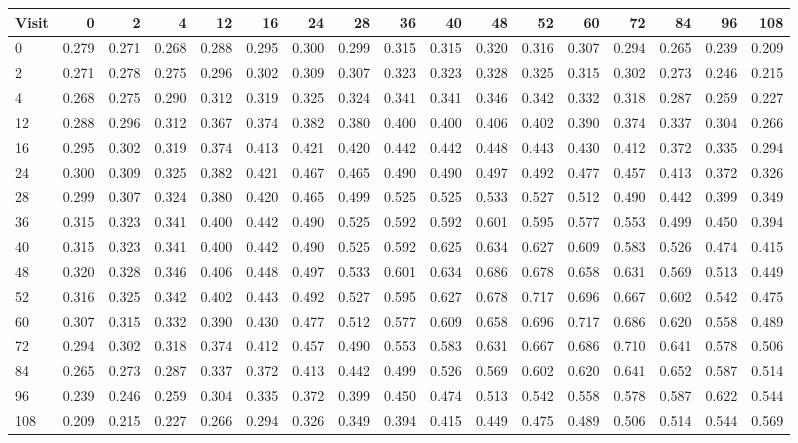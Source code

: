 \small
\begin{tabular}{lrrrrrrrrrrrrrrrr}
\hline
Visit & 0 & 2 & 4 & 12 & 16 & 24 & 28 & 36 & 40 & 48 & 52 & 60 & 72 & 84 & 96 & 108 \\
\hline
0 & 0.279 & 0.271 & 0.268 & 0.288 & 0.295 & 0.300 & 0.299 & 0.315 & 0.315 & 0.320 & 0.316 & 0.307 & 0.294 & 0.265 & 0.239 & 0.209 \\
2 & 0.271 & 0.278 & 0.275 & 0.296 & 0.302 & 0.309 & 0.307 & 0.323 & 0.323 & 0.328 & 0.325 & 0.315 & 0.302 & 0.273 & 0.246 & 0.215 \\
4 & 0.268 & 0.275 & 0.290 & 0.312 & 0.319 & 0.325 & 0.324 & 0.341 & 0.341 & 0.346 & 0.342 & 0.332 & 0.318 & 0.287 & 0.259 & 0.227 \\
12 & 0.288 & 0.296 & 0.312 & 0.367 & 0.374 & 0.382 & 0.380 & 0.400 & 0.400 & 0.406 & 0.402 & 0.390 & 0.374 & 0.337 & 0.304 & 0.266 \\
16 & 0.295 & 0.302 & 0.319 & 0.374 & 0.413 & 0.421 & 0.420 & 0.442 & 0.442 & 0.448 & 0.443 & 0.430 & 0.412 & 0.372 & 0.335 & 0.294 \\
24 & 0.300 & 0.309 & 0.325 & 0.382 & 0.421 & 0.467 & 0.465 & 0.490 & 0.490 & 0.497 & 0.492 & 0.477 & 0.457 & 0.413 & 0.372 & 0.326 \\
28 & 0.299 & 0.307 & 0.324 & 0.380 & 0.420 & 0.465 & 0.499 & 0.525 & 0.525 & 0.533 & 0.527 & 0.512 & 0.490 & 0.442 & 0.399 & 0.349 \\
36 & 0.315 & 0.323 & 0.341 & 0.400 & 0.442 & 0.490 & 0.525 & 0.592 & 0.592 & 0.601 & 0.595 & 0.577 & 0.553 & 0.499 & 0.450 & 0.394 \\
40 & 0.315 & 0.323 & 0.341 & 0.400 & 0.442 & 0.490 & 0.525 & 0.592 & 0.625 & 0.634 & 0.627 & 0.609 & 0.583 & 0.526 & 0.474 & 0.415 \\
48 & 0.320 & 0.328 & 0.346 & 0.406 & 0.448 & 0.497 & 0.533 & 0.601 & 0.634 & 0.686 & 0.678 & 0.658 & 0.631 & 0.569 & 0.513 & 0.449 \\
52 & 0.316 & 0.325 & 0.342 & 0.402 & 0.443 & 0.492 & 0.527 & 0.595 & 0.627 & 0.678 & 0.717 & 0.696 & 0.667 & 0.602 & 0.542 & 0.475 \\
60 & 0.307 & 0.315 & 0.332 & 0.390 & 0.430 & 0.477 & 0.512 & 0.577 & 0.609 & 0.658 & 0.696 & 0.717 & 0.686 & 0.620 & 0.558 & 0.489 \\
72 & 0.294 & 0.302 & 0.318 & 0.374 & 0.412 & 0.457 & 0.490 & 0.553 & 0.583 & 0.631 & 0.667 & 0.686 & 0.710 & 0.641 & 0.578 & 0.506 \\
84 & 0.265 & 0.273 & 0.287 & 0.337 & 0.372 & 0.413 & 0.442 & 0.499 & 0.526 & 0.569 & 0.602 & 0.620 & 0.641 & 0.652 & 0.587 & 0.514 \\
96 & 0.239 & 0.246 & 0.259 & 0.304 & 0.335 & 0.372 & 0.399 & 0.450 & 0.474 & 0.513 & 0.542 & 0.558 & 0.578 & 0.587 & 0.622 & 0.544 \\
108 & 0.209 & 0.215 & 0.227 & 0.266 & 0.294 & 0.326 & 0.349 & 0.394 & 0.415 & 0.449 & 0.475 & 0.489 & 0.506 & 0.514 & 0.544 & 0.569 \\
\hline
\end{tabular}
